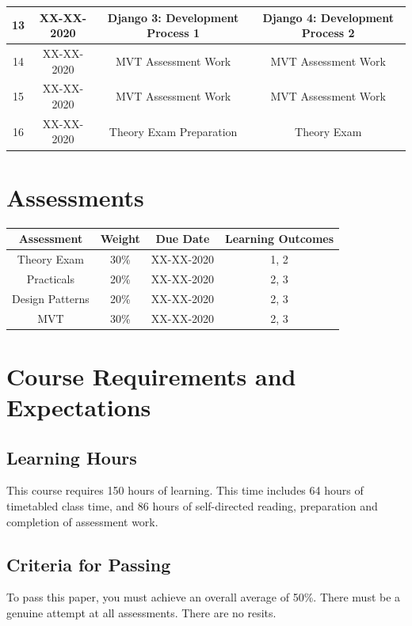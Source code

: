 \documentclass{article}
\begin{document}
\begin{tabular}{|c|c|c|c|}
	13            & XX-XX-2020    & Django 3: Development Process 1     & Django 4: Development Process 2 \\ \hline
	14            & XX-XX-2020    & MVT Assessment Work                 & MVT Assessment Work             \\ \hline
	15            & XX-XX-2020    & MVT Assessment Work                 & MVT Assessment Work             \\ \hline
	16            & XX-XX-2020    & Theory Exam Preparation             & Theory Exam                     \\ \hline
\end{tabular}

\section*{Assessments}
\renewcommand{\arraystretch}{1.5}
\begin{tabular}{|c|c|c|c|}
	\hline
	\textbf{Assessment} & \textbf{Weight} & \textbf{Due Date} & \textbf{Learning Outcomes} \\ \hline
	Theory Exam         & 30\%            & XX-XX-2020        & 1, 2                       \\ \hline
	Practicals          & 20\%            & XX-XX-2020        & 2, 3                       \\ \hline
	Design Patterns     & 20\%            & XX-XX-2020        & 2, 3                       \\ \hline
	MVT                 & 30\%            & XX-XX-2020        & 2, 3                       \\ \hline
						
\end{tabular}

\section*{Course Requirements and Expectations}

\subsection*{Learning Hours}
This course requires 150 hours of learning. This time includes 64 hours of timetabled class time, and 86 hours of self-directed reading, preparation and completion of assessment work.

\subsection*{Criteria for Passing}
To pass this paper, you must achieve an overall average of 50\%. There must be a genuine attempt at all assessments. There are no resits.
\end{document}
